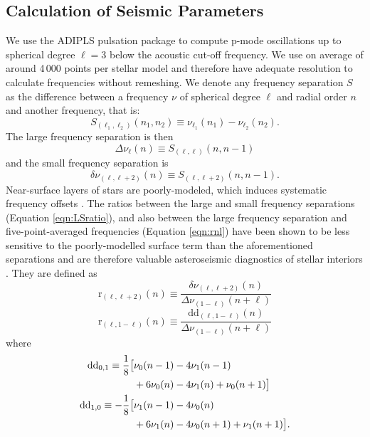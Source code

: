 \documentclass[twocolumn,twocolappendix]{aastex6}
\begin{document}
\subsection{Calculation of Seismic Parameters}
\label{sec:seis}
We use the ADIPLS pulsation package \citep{2008Ap&SS.316..113C} to compute p-mode oscillations up to spherical degree $\ell=3$ below the acoustic cut-off frequency. We use on average of around 4\,000 points per stellar model and therefore have adequate resolution to calculate frequencies without remeshing. We denote any frequency separation $S$ as the difference between a frequency $\nu$ of spherical degree $\ell$ and radial order $n$ and another frequency, that is: 
\begin{equation} 
  S_{(\ell_1, \ell_2)}(n_1, n_2) \equiv \nu_{\ell_1}(n_1) - \nu_{\ell_2}(n_2).
\end{equation}
The large frequency separation is then
\begin{equation} 
  \Delta\nu_\ell(n) \equiv S_{(\ell, \ell)}(n, n-1)
\end{equation}
and the small frequency separation is
\begin{equation}
  \delta\nu_{(\ell, \ell+2)}(n) \equiv S_{(\ell, \ell+2)}(n, n-1).
\end{equation}
Near-surface layers of stars are poorly-modeled, which induces systematic frequency offsets \citep[see e.g.][]{1999A&A...351..689R}. The ratios between the large and small frequency separations (Equation \ref{eqn:LSratio}), and also between the large frequency separation and five-point-averaged frequencies (Equation \ref{eqn:rnl}) have been shown to be less sensitive to the poorly-modelled surface term than the aforementioned separations and are therefore valuable asteroseismic diagnostics of stellar interiors \citep{2003A&A...411..215R}. They are defined as
\begin{equation} 
  \mathrm{r}_{(\ell,\ell+2)}(n) \equiv \frac{\delta\nu_{(\ell, \ell+2)}(n)}{\Delta\nu_{(1-\ell)}(n+\ell)} \label{eqn:LSratio}
\end{equation}
\begin{equation} 
  \mathrm{r}_{(\ell, 1-\ell)}(n) \equiv \frac{\mathrm{dd}_{(\ell,1-\ell)}(n)}{\Delta\nu_{(1-\ell)}(n+\ell)} \label{eqn:rnl}
\end{equation}
where
\begin{align} 
  \mathrm{dd}_{0,1} \equiv \frac{1}{8} \big[&\nu_0(n-1) - 4\nu_1(n-1) \notag\\
                                 &+6\nu_0(n) - 4\nu_1(n) + \nu_0(n+1)\big]\\ 
  \mathrm{dd}_{1,0} \equiv -\frac{1}{8} \big[&\nu_1(n-1) - 4\nu_0(n) \notag\\
                                 &+6\nu_1(n) - 4\nu_0(n+1) + \nu_1(n+1)\big].
\end{align}
\end{document}
